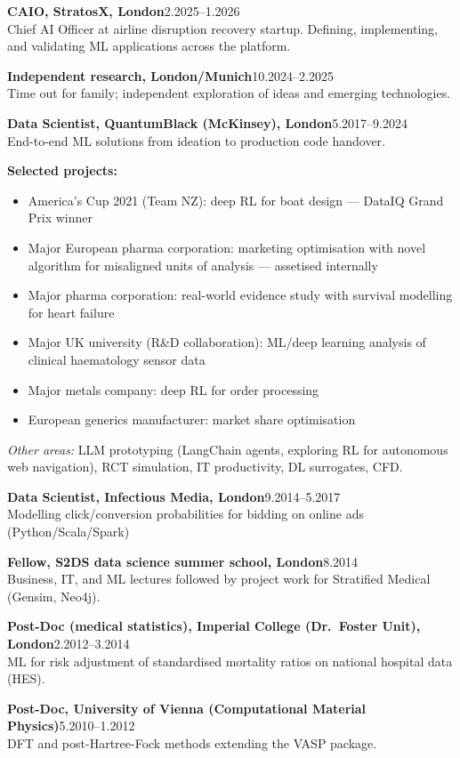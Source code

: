 \documentclass[11pt,a4paper]{article}
\newcommand{\entry}[3]{%
    \noindent\textbf{#1}\hfill #2\\
    #3\par\vspace{6pt}%
}
\begin{document}
\entry{CAIO, StratosX, London}{2.2025--1.2026}{%
Chief AI Officer at airline disruption recovery startup. Defining, implementing, and validating ML applications across the platform.}

\entry{Independent research, London/Munich}{10.2024--2.2025}{%
Time out for family; independent exploration of ideas and emerging technologies.}

\entry{Data Scientist, QuantumBlack (McKinsey), London}{5.2017--9.2024}{%
End-to-end ML solutions from ideation to production code handover.

\textbf{Selected projects:}
\begin{itemize}[nosep, leftmargin=2\parindent, itemsep=2pt]
    \item America's Cup 2021 (Team NZ): deep RL for boat design --- DataIQ Grand Prix winner
    \item Major European pharma corporation: marketing optimisation with novel algorithm for misaligned units of analysis --- assetised internally
    \item Major pharma corporation: real-world evidence study with survival modelling for heart failure
    \item Major UK university (R\&D collaboration): ML/deep learning analysis of clinical haematology sensor data
    \item Major metals company: deep RL for order processing
    \item European generics manufacturer: market share optimisation
\end{itemize}

\textit{Other areas:} LLM prototyping (LangChain agents, exploring RL for autonomous web navigation), RCT simulation, IT productivity, DL surrogates, CFD.}

\entry{Data Scientist, Infectious Media, London}{9.2014--5.2017}{%
Modelling click/conversion probabilities for bidding on online ads (Python/Scala/Spark)}

\entry{Fellow, S2DS data science summer school, London}{8.2014}{%
Business, IT, and ML lectures followed by project work for Stratified Medical (Gensim, Neo4j).}

\entry{Post-Doc (medical statistics), Imperial College (Dr.\ Foster Unit), London}{2.2012--3.2014}{%
ML for risk adjustment of standardised mortality ratios on national hospital data (HES).}

\entry{Post-Doc, University of Vienna (Computational Material Physics)}{5.2010--1.2012}{%
DFT and post-Hartree-Fock methods extending the VASP package.}
\end{document}
